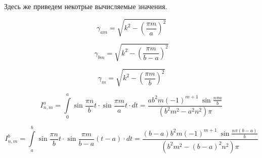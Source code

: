 Здесь же приведем некотрые вычисляемые значения.

$$
	\gamma_{am} = \sqrt{k^2 - \left(\frac{\pi m}{a}\right)^2}
$$

$$
	\gamma_{bm} = \sqrt{k^2 - \left(\frac{\pi m}{b-a}\right)^2}
$$

$$
	\gamma_{m} = \sqrt{k^2 - \left(\frac{\pi m}{b}\right)^2}
$$

$$
	I^a_{n,m} = \int\limits_0^a\sin{\frac{\pi n}{b}t} \cdot \sin{\frac{\pi m}{a}t} \cdot dt = \frac{ab^2m(-1)^{m+1}\ \sin{\frac{n \pi a}{b}}}{(b^2m^2 - a^2n^2)\pi}
$$

$$
	I^b_{n,m} = \int\limits_a^b\sin{\frac{\pi n}{b}t} \cdot \sin{\frac{\pi m}{b-a}(t-a)} \cdot dt = \frac{(b-a)b^2m(-1)^{m+1}\ \sin{\frac{n \pi (b-a)}{b}}}{(b^2m^2 - (b-a)^2n^2)\pi}
$$